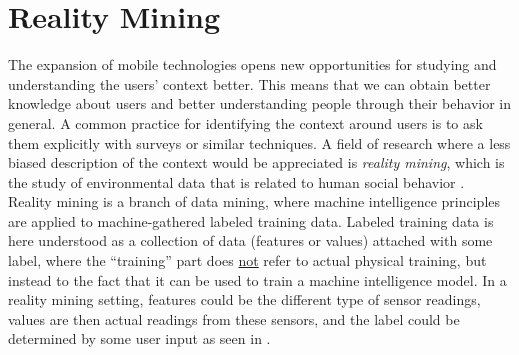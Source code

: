 
\section{Reality Mining}
\label{sec:reality_mining}
The expansion of mobile technologies opens new opportunities for studying and understanding the users' context better. This means that we can obtain better knowledge about users and better understanding people through their behavior in general. A common practice for identifying the context around users is to ask them explicitly with surveys or similar techniques. A field of research where a less biased description of the context would be appreciated is \emph{reality mining}, which is the study of environmental data that is related to human social behavior \parencite{madan2009_reality_mining_privacy}. Reality mining is a branch of data mining, where machine intelligence principles are applied to machine-gathered labeled training data. Labeled training data is here understood as a collection of data (features or values) attached with some label, where the ``training'' part does \underline{not} refer to actual physical training, but instead to the fact that it can be used to train a machine intelligence model. In a reality mining setting, features could be the different type of sensor readings, values are then actual readings from these sensors, and the label could be determined by some user input as seen in .
\begin{table}[!htbp]
    \centering
    \caption{Example of labeled training data.}
    \label{tab:labeled_training_data}
\end{table}

